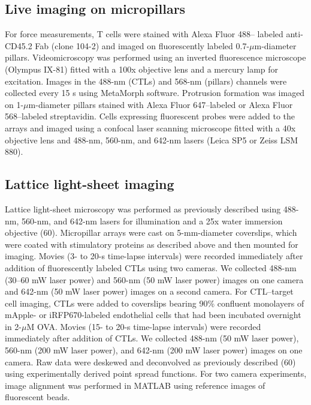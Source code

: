 \subsection{Live imaging on micropillars}
For force measurements, T cells were stained with Alexa Fluor 488– labeled anti-CD45.2 Fab (clone 104-2) and imaged on fluorescently labeled 0.7-$\mu$m-diameter pillars. Videomicroscopy was performed using an inverted fluorescence microscope (Olympus IX-81) fitted with a 100x objective lens and a mercury lamp for excitation. Images in the 488-nm (CTLs) and 568-nm (pillars) channels were collected every 15 s using MetaMorph software. Protrusion formation was imaged on 1-$\mu$m-diameter pillars stained with Alexa Fluor 647–labeled or Alexa Fluor 568–labeled streptavidin. Cells expressing fluorescent probes were added to the arrays and imaged using a confocal laser scanning microscope fitted with a 40x objective lens and 488-nm, 560-nm, and 642-nm lasers (Leica SP5 or Zeiss LSM 880).

\subsection{Lattice light-sheet imaging}
Lattice light-sheet microscopy was performed as previously described using 488-nm, 560-nm, and 642-nm lasers for illumination and a 25x water immersion objective (60). Micropillar arrays were cast on 5-mm-diameter coverslips, which were coated with stimulatory proteins as described above and then mounted for imaging. Movies (3- to 20-s time-lapse intervals) were recorded immediately after addition of fluorescently labeled CTLs using two cameras. We collected 488-nm (30–60 mW laser power) and 560-nm (50 mW laser power) images on one camera and 642-nm (50 mW laser power) images on a second camera. For CTL–target cell imaging, CTLs were added to coverslips bearing 90\% confluent monolayers of mApple- or iRFP670-labeled endothelial cells that had been incubated overnight in 2-$\mu$M OVA. Movies (15- to 20-s time-lapse intervals) were recorded immediately after addition of CTLs. We collected 488-nm (50 mW laser power), 560-nm (200 mW laser power), and 642-nm (200 mW laser power) images on one camera. Raw data were deskewed and deconvolved as previously described (60) using experimentally derived point spread functions. For two camera experiments, image alignment was performed in MATLAB using reference images of fluorescent beads.

